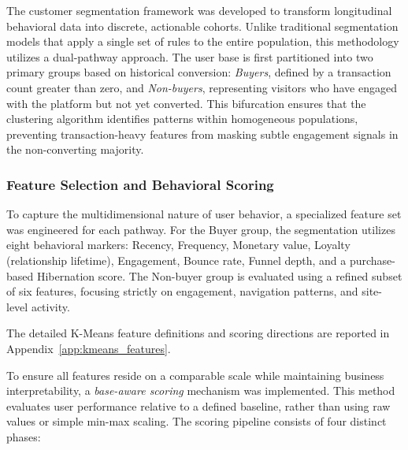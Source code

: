 \documentclass[conference]{IEEEtran}
\begin{document}
The customer segmentation framework was developed to transform longitudinal behavioral data into discrete, actionable cohorts. Unlike traditional segmentation models that apply a single set of rules to the entire population, this methodology utilizes a dual-pathway approach. The user base is first partitioned into two primary groups based on historical conversion: \textit{Buyers}, defined by a transaction count greater than zero, and \textit{Non-buyers}, representing visitors who have engaged with the platform but not yet converted. This bifurcation ensures that the clustering algorithm identifies patterns within homogeneous populations, preventing transaction-heavy features from masking subtle engagement signals in the non-converting majority.

\subsubsection{Feature Selection and Behavioral Scoring}

To capture the multidimensional nature of user behavior, a specialized feature set was engineered for each pathway. For the Buyer group, the segmentation utilizes eight behavioral markers: Recency, Frequency, Monetary value, Loyalty (relationship lifetime), Engagement, Bounce rate, Funnel depth, and a purchase-based Hibernation score. The Non-buyer group is evaluated using a refined subset of six features, focusing strictly on engagement, navigation patterns, and site-level activity.


The detailed K-Means feature definitions and scoring directions are reported in Appendix~\ref{app:kmeans_features}.

To ensure all features reside on a comparable scale while maintaining business interpretability, a \textit{base-aware scoring} mechanism was implemented. This method evaluates user performance relative to a defined baseline, rather than using raw values or simple min-max scaling. The scoring pipeline consists of four distinct phases:
\end{document}
